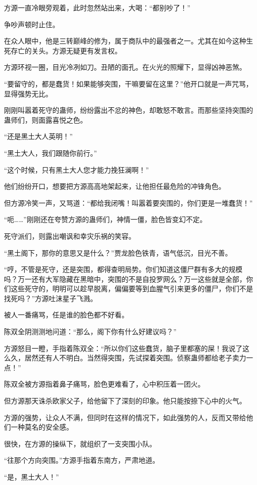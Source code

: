 \begin{this_body}
方源一直冷眼旁观着，此时忽然站出来，大喝：“都别吵了！”

争吵声顿时止住。

在众人眼中，他是三转巅峰的修为，属于商队中的最强者之一。尤其在如今这种生死存亡的关头。方源无疑更有发言权。

方源环视一圈，目光冷冽如刀。丑陋的面孔。在火光的照耀下，显得凶神恶煞。

“要留守的，都是蠢货！如果能够突围，干嘛要留在这里？”他开口就是一声咒骂，显得强势无比。

刚刚叫嚣着死守的蛊师，纷纷露出不忿的神色，却敢怒不敢言。而那些坚持突围的蛊师们，则面露喜悦之色。

“还是黑土大人英明！”

“黑土大人，我们跟随你前行。”

“这个时候，只有黑土大人您才能力挽狂澜啊！”

他们纷纷开口，想要把方源高高地架起来，让他担任最危险的冲锋角色。

但方源冷笑一声，又骂道：“都给我闭嘴！叫嚣着要突围的，你们更是一堆蠢货！”

“呃……”刚刚还在夸赞方源的蛊师们，神情一僵，脸色皆变幻不定。

死守派们，则露出嘲讽和幸灾乐祸的笑容。

“黑土阁下，那你的意思又是什么？”贾龙脸色铁青，语气低沉，目光不善。

“哼，不管是死守，还是突围，都得查明局势。你们知道这僵尸群有多大的规模吗？万一还有大军隐藏在黑暗中，突围的不是自投罗网么？万一这些就是全部，你们这些死守的，明明可以趁早脱离，偏偏要等到血腥气引来更多的僵尸，你们不是找死吗？”方源吐沫星子飞溅。

被人一番痛骂，任是谁的脸色都不好看。

陈双全阴测测地问道：“那么，阁下你有什么好建议吗？”

方源怒目一瞪，手指着陈双全：“所以你们这些蠢货，脑子里都塞的屎！我说了这么久，居然还有人不明白。当然得突围，先试探着突围。侦察蛊师都给老子卖力一点！”

陈双全被方源指着鼻子痛骂，脸色更难看了，心中积压着一团火。

但方源那天诛杀欧家父子，给他留下了深刻的印象。他只能按捺下心中的火气。

方源的强势，让众人不满，但同时在这样的情况下，如此强势的人，反而又带给他们一种莫名的安全感。

很快，在方源的操纵下，就组织了一支突围小队。

“往那个方向突围。”方源手指着东南方，严肃地道。

“是，黑土大人！”


\end{this_body}
